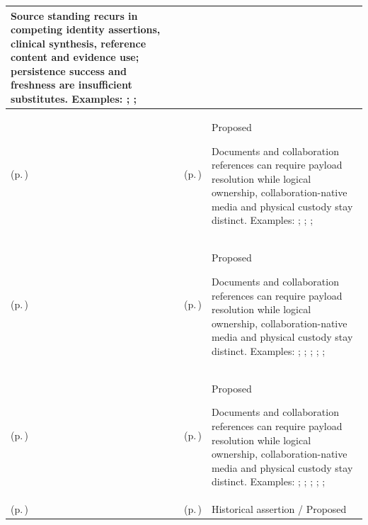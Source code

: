 \begin{longtable}{|>{\raggedright\arraybackslash}p{0.27\TableWidth}|>{\raggedright\arraybackslash}p{0.27\TableWidth}|>{\raggedright\arraybackslash}p{0.46\TableWidth}|}
Source standing recurs in competing identity assertions, clinical synthesis, reference content and evidence use; persistence success and freshness are insufficient substitutes. Examples: \nameref{feature:governed-dataset-content-revision}; \nameref{function:accept-governed-dataset-revision}; \nameref{service:governed-reference-dataset-content-query}\\\hline
\nameref{cap:bec-associated-clinical-binary-content-enablement} (p.\,\pageref{cap:bec-associated-clinical-binary-content-enablement}) & \nameref{cap:ec-binary-content-association-resolution} (p.\,\pageref{cap:ec-binary-content-association-resolution}) & Proposed

Documents and collaboration references can require payload resolution while logical ownership, collaboration-native media and physical custody stay distinct. Examples: \nameref{feature:binary-content-resolution-assembly}; \nameref{function:resolve-associated-binary-content}; \nameref{function:assemble-associated-binary-content}; \nameref{service:associated-binary-content-retrieval}\\\hline
\nameref{cap:bec-clinical-record-administration} (p.\,\pageref{cap:bec-clinical-record-administration}) & \nameref{cap:ec-binary-content-association-resolution} (p.\,\pageref{cap:ec-binary-content-association-resolution}) & Proposed

Documents and collaboration references can require payload resolution while logical ownership, collaboration-native media and physical custody stay distinct. Examples: \nameref{feature:feat-sa-23}; \nameref{feature:feat-sa-24}; \nameref{feature:feat-sa-25}; \nameref{function:receive-clinical-document}; \nameref{service:clinical-document-ingress}; \nameref{function:govern-clinical-document-lifecycle}\\\hline
\nameref{cap:bec-clinical-collaboration} (p.\,\pageref{cap:bec-clinical-collaboration}) & \nameref{cap:ec-binary-content-association-resolution} (p.\,\pageref{cap:ec-binary-content-association-resolution}) & Proposed

Documents and collaboration references can require payload resolution while logical ownership, collaboration-native media and physical custody stay distinct. Examples: \nameref{feature:feat-ise-16}; \nameref{feature:feat-ise-17}; \nameref{feature:feat-ise-18}; \nameref{function:coordinate-care-team-collaboration}; \nameref{service:clinical-collaboration-space-service}; \nameref{function:resolve-lhr-query-within-collaboration}\\\hline
\nameref{cap:bec-significant-activity-audit-capture} (p.\,\pageref{cap:bec-significant-activity-audit-capture}) & \nameref{cap:ec-governed-activity-audit-evidence} (p.\,\pageref{cap:ec-governed-activity-audit-evidence}) & Historical assertion / Proposed


\end{longtable}
